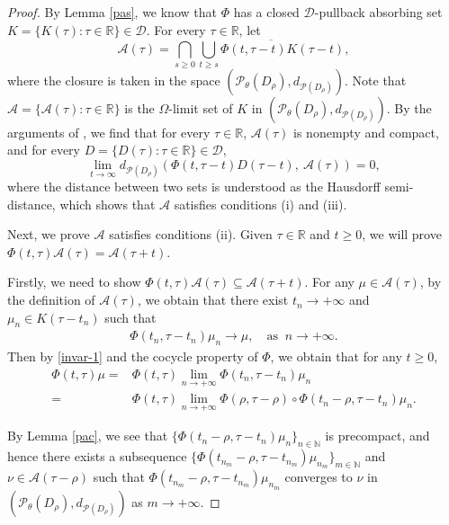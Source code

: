 \documentclass[11pt]{article}
\numberwithin{equation}{section}
\theoremstyle{plain}
\begin{document}
\begin{proof}
  By Lemma \ref{pas},  we know that
  $\Phi$ has a closed $\mathcal{D}$-pullback absorbing set
          $K = \{ K(\tau): \tau \in \mathbb{R} \} \in \mathcal{D}$.
  For  every  $\tau \in \mathbb{R}$, 
  let 
  $$
  \mathcal{A}(\tau)
     = \bigcap_{s \ge  0 } \overline{\bigcup_{t \ge s} \Phi(t, \tau-t) K(\tau - t)},
     $$
     where the closure
     is taken
     in  
   the space $(\mathcal{P}_{\theta}(D_{\rho}), 
   d_{\mathcal{P}(D_{\rho} ) } )$. 
   Note that  $ \mathcal{A}
   =\{  \mathcal{A}(\tau): \tau \in
   \mathbb{R}\}$ is the 
   $\mathit{\Omega}$-limit set of $K$ in 
    $(\mathcal{P}_{\theta}(D_{\rho}), 
   d_{\mathcal{P}(D_{\rho} ) } )$.  
   By the arguments of  \cite{bwang2012JDE}, 
   we find that
   for every
   $\tau \in \mathbb{R}$,
    $\mathcal{A}(\tau)$ is nonempty and
   compact, and  for every  
   $ D
   =\{  D(\tau): \tau \in
   \mathbb{R}\} \in \mathcal{D}$,
   $$
   \lim_{t\to \infty}
   d_{\mathcal{P}(D_{\rho} )}
   (\Phi (t, \tau -t) D(\tau-t), \
   \mathcal{A}(\tau) ) =0,
   $$ 
   where the distance between
   two sets is understood as
   the Hausdorff 
   semi-distance,
   which shows that
   $\mathcal{A}$
    satisfies conditions (i) and (iii).
    
     Next, we prove  $ \mathcal{A} $ 
      satisfies conditions (ii).
 Given $\tau \in \mathbb{R}$ and $t \ge 0$, 
 we will prove $\Phi(t, \tau) \mathcal{A}(\tau) = \mathcal{A}(\tau+t)$.
 
 Firstly, we need to show $\Phi(t, \tau) \mathcal{A}(\tau) \subseteq \mathcal{A}(\tau+t)$.
 For any $\mu \in \mathcal{A}(\tau)$, by the definition of $\mathcal{A}(\tau)$,
 we obtain that there exist $t_n \to +\infty$ and $\mu_n \in K(\tau - t_n) $ such that
 \begin{align}\label{invar-1}
       \Phi(t_n , \tau  - t_n) \mu_n \rightarrow \mu,
       \quad \text{as } \ n \to +\infty.
  \end{align}
 Then by \eqref{invar-1} and the cocycle property of $\Phi$, 
 we obtain that for any $t \ge 0$, 
  \begin{align} \label{invar-2}
     \Phi(t, \tau) \mu
     = & \Phi(t, \tau)  
              \lim_{n \to +\infty} \Phi(t_n , \tau  - t_n) \mu_n \nonumber\\
      =& \Phi(t, \tau)  
             \lim_{n \to +\infty} 
                   \Phi(\rho, \tau-\rho) \circ \Phi(t_n -\rho , \tau  - t_n) \mu_n.
 \end{align}
 
 By Lemma \ref{pac}, 
 we see that  $\{ \Phi(t_n -\rho , \tau  - t_n) \mu_n \}_{n \in \mathbb{N} }$ is precompact, 
 and hence there exists a subsequence 
  $\{ \Phi(t_{n_m} - \rho , \tau  - t_{n_m}) \mu_{n_m} \}_{m \in \mathbb{N} }$ and $\nu \in \mathcal{A}(\tau - \rho)$ such that
 $\Phi(t_{n_m} - \rho , \tau - t_{n_m}) \mu_{n_m}$ converges to $\nu$ in $(\mathcal{P}_{\theta}(D_{\rho}), d_{\mathcal{P}(D_{\rho} ) } )$ as $m \to +\infty$.
 

\end{proof}
\end{document}
